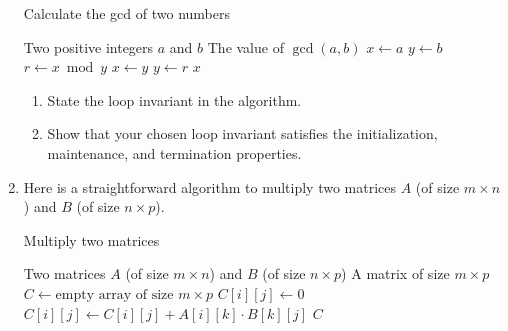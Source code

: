 \begin{exercises}
\begin{enumerate}
        \begin{algorithm}[H]
            \caption{Calculate the gcd of two numbers}
            \begin{algorithmic}[1]
                \Require Two positive integers $a$ and $b$
                \Ensure The value of $\gcd\left(a, b\right)$
                    \State $x \gets a$
                    \State $y \gets b$
                        \State $r \gets x \bmod y$
                        \State $x \gets y$
                        \State $y \gets r$
                    \EndWhile
                    \Return $x$
                \EndFunction
            \end{algorithmic}
        \end{algorithm}

        \begin{enumerate}
            \item State the loop invariant in the algorithm.
            \item Show that your chosen loop invariant satisfies the initialization, maintenance, and termination properties.
        \end{enumerate}

    \item[\challenge] Here is a straightforward algorithm to multiply two matrices $A$ (of size $m \times n$) and $B$ (of size $n \times p$).
        \begin{algorithm}[H]
            \caption{Multiply two matrices}
            \begin{algorithmic}[1]
                \Require Two matrices $A$ (of size $m \times n$) and $B$ (of size $n \times p$)
                \Ensure A matrix of size $m \times p$
                    \State $C \gets \text{empty array of size $m \times p$}$
                            \State $C[i][j] \gets 0$
                                \State $C[i][j] \gets C[i][j] + A[i][k]\cdot B[k][j]$
                            \EndFor
                        \EndFor
                    \EndFor
                    \Return $C$
                \EndFunction
            \end{algorithmic}
        \end{algorithm}


\end{enumerate}
\end{exercises}
